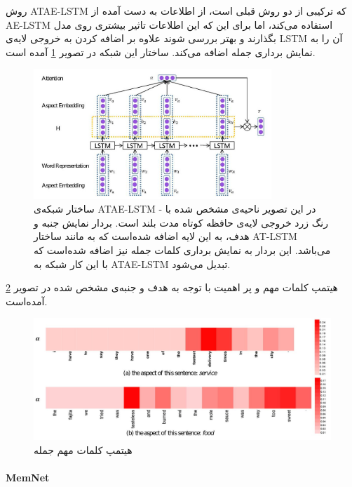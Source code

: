 \documentclass[12pt, a4paper, oneside]{report}
\begin{document}
روش
ATAE-LSTM
که ترکیبی از دو روش قبلی است، از اطلاعات به دست آمده از
AE-LSTM
استفاده می‌کند، اما برای این که این اطلاعات تاثیر بیشتری روی مدل بگذارند و بهتر بررسی شوند علاوه بر
اضافه کردن به خروجی لایه‌ی
LSTM
آن را به نمایش برداری جمله اضافه می‌کند. ساختار این شبکه در تصویر
\ref{fig:ATAE-LSTM}
آمده است.

\begin{figure}[!ht]
    \centering
    \includegraphics[width=0.8\textwidth]{ATAE-LSTM}
    \caption{ ساختار شبکه‌ی 
        ATAE-LSTM -
        در این تصویر ناحیه‌ی مشخص شده با رنگ زرد خروجی لایه‌ی حافظه کوتاه مدت بلند است.
        بردار نمایش جنبه و هدف، به این لایه اضافه شده‌است که به مانند ساختار
        AT-LSTM
        می‌باشد. این بردار به نمایش برداری کلمات جمله نیز اضافه شده‌است که با این کار شبکه به
        ATAE-LSTM
        تبدیل می‌شود.
    }
    \label{fig:ATAE-LSTM}
\end{figure}

هیتمپ کلمات مهم و پر اهمیت با توجه به هدف و جنبه‌ی مشخص شده در تصویر
\ref{fig:ATAE-HM}
آمده‌است.

\begin{figure}[!ht]
    \centering
    \includegraphics[width=1\textwidth]{ATAE-HM}
    \caption{ هیتمپ کلمات مهم جمله }
    \label{fig:ATAE-HM}
\end{figure}

\paragraph{MemNet} \hfill \break
\end{document}
